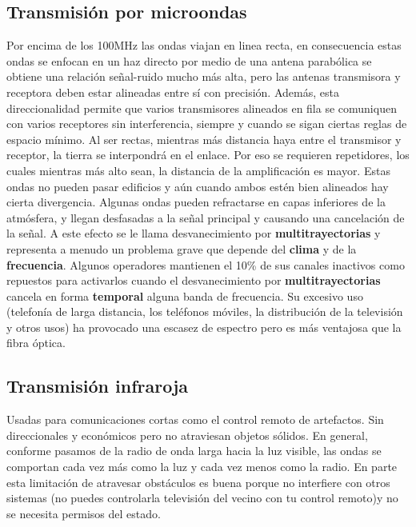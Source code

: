 \documentclass[
	12pt, %
	fleqn, %
	a4paper, %
]{LegrandOrangeBook}
\begin{document}
\subsection{Transmisión por microondas}
Por encima de los 100MHz las ondas viajan en linea recta, en consecuencia estas ondas se enfocan en un haz directo por medio de una antena parabólica se obtiene una relación señal-ruido mucho más alta, pero las antenas transmisora y receptora deben estar alineadas entre sí con precisión. Además, esta direccionalidad permite que varios transmisores alineados en fila se comuniquen con varios receptores sin interferencia, siempre y cuando se sigan ciertas reglas de espacio mínimo. Al ser rectas, mientras más distancia haya entre el transmisor y receptor, la tierra se interpondrá en el enlace. Por eso se requieren repetidores, los cuales mientras más alto sean, la distancia de la amplificación es mayor. Estas ondas no pueden pasar edificios y aún cuando ambos estén bien alineados hay cierta divergencia. Algunas ondas pueden refractarse en capas inferiores de la atmósfera, y llegan desfasadas a la señal principal y causando una cancelación de la señal. A este efecto se le llama desvanecimiento por \textbf{multitrayectorias} y representa a menudo un problema grave que depende del \textbf{clima} y de la \textbf{frecuencia}. Algunos operadores mantienen el 10\% de sus canales inactivos como repuestos para activarlos cuando el desvanecimiento por \textbf{multitrayectorias} cancela en forma \textbf{temporal} alguna banda de frecuencia. Su excesivo uso (telefonía de larga distancia, los teléfonos móviles, la distribución de la televisión y otros usos) ha provocado una escasez de espectro pero es más ventajosa que la fibra óptica.
\subsection{Transmisión infraroja}
Usadas para comunicaciones cortas como el control remoto de artefactos. Sin direccionales y económicos pero no atraviesan objetos sólidos. En general, conforme pasamos de la radio de onda larga hacia la luz visible, las ondas se comportan cada vez más como la luz y cada vez menos como la radio. En parte esta limitación de atravesar obstáculos es buena porque no interfiere con otros sistemas (no puedes controlarla televisión del vecino con tu control remoto)y no se necesita permisos del estado.
\end{document}
